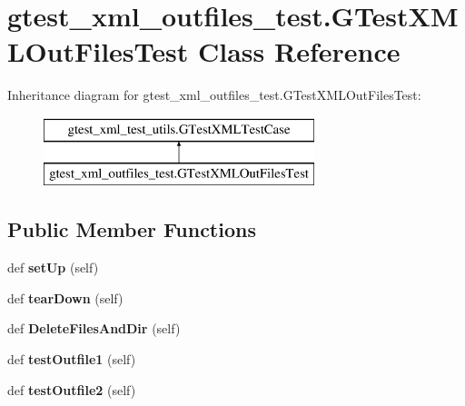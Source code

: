 \hypertarget{classgtest__xml__outfiles__test_1_1GTestXMLOutFilesTest}{}\section{gtest\+\_\+xml\+\_\+outfiles\+\_\+test.\+G\+Test\+X\+M\+L\+Out\+Files\+Test Class Reference}
\label{classgtest__xml__outfiles__test_1_1GTestXMLOutFilesTest}
Inheritance diagram for gtest\+\_\+xml\+\_\+outfiles\+\_\+test.\+G\+Test\+X\+M\+L\+Out\+Files\+Test\+:\begin{figure}[H]
\begin{center}
\leavevmode
\includegraphics[height=2.000000cm]{classgtest__xml__outfiles__test_1_1GTestXMLOutFilesTest}
\end{center}
\end{figure}
\subsection*{Public Member Functions}
\begin{DoxyCompactItemize}
\item 
\mbox{\label{classgtest__xml__outfiles__test_1_1GTestXMLOutFilesTest_a56550f293277d18c36e868a637fe1153}} 
def {\bfseries set\+Up} (self)
\item 
\mbox{\label{classgtest__xml__outfiles__test_1_1GTestXMLOutFilesTest_a49d1d410370ba8a3cfcc281eaadb5706}} 
def {\bfseries tear\+Down} (self)
\item 
\mbox{\label{classgtest__xml__outfiles__test_1_1GTestXMLOutFilesTest_a503d2fbc9cd782ae57ac4307d2db43e1}} 
def {\bfseries Delete\+Files\+And\+Dir} (self)
\item 
\mbox{\label{classgtest__xml__outfiles__test_1_1GTestXMLOutFilesTest_a034738bbc00ac46d00f183402c561228}} 
def {\bfseries test\+Outfile1} (self)
\item 
\mbox{\label{classgtest__xml__outfiles__test_1_1GTestXMLOutFilesTest_a3c02687f092a482d0d0260c7ed94c618}} 
def {\bfseries test\+Outfile2} (self)
\end{DoxyCompactItemize}
